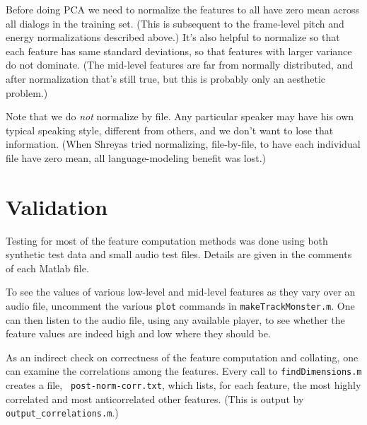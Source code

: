 \documentclass[11pt]{article}
\begin{document}
Before doing PCA we need to normalize the features to all have zero
mean across all dialogs in the training set.  (This is subsequent to
the frame-level pitch and energy normalizations described above.)
It's also helpful to normalize so that each feature has same standard
deviations, so that features with larger variance do not dominate.
(The mid-level features are far from normally distributed, and after
normalization that's still true, but this is probably only an
aesthetic problem.)


Note that we do {\em not} normalize by file.  Any particular speaker
may have his own typical speaking style, different from others, and we
don't want to lose that information.  (When Shreyas tried normalizing,
file-by-file, to have each individual file have zero mean, all
language-modeling benefit was lost.)



\section{Validation}

Testing for most of the feature computation methods was done using
both synthetic test data and small audio test files.  Details are
given in the comments of each Matlab file.

To see the values of various low-level and mid-level features as they
vary over an audio file, uncomment the various {\tt plot} commands in
{\tt makeTrackMonster.m}.  One can then listen to the audio file,
using any available player, to see whether the feature values are
indeed high and low where they should be.

As an indirect check on correctness of the feature computation and
collating, one can examine the correlations among the features.  Every
call to {\tt findDimensions.m} creates a file, {\tt
  post-norm-corr.txt}, which lists, for each feature, the most highly
correlated and most anticorrelated other features.  (This is output by
{\tt output\_correlations.m}.)
\end{document}
